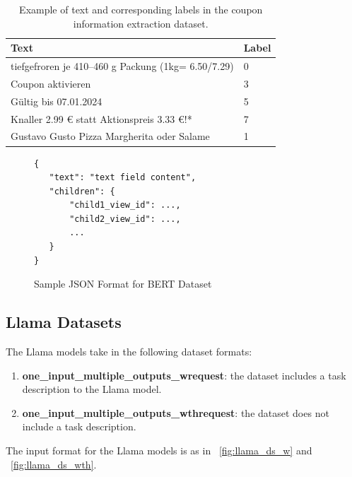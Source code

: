 \documentclass[licencjacka,en]{pracamgr}
\begin{document}
\begin{table}[h]
\centering
\begin{tabular}{|p{8cm}|p{2cm}|}
\hline
\textbf{Text} & \textbf{Label} \\
\hline
tiefgefroren je 410--460 g Packung (1kg= 6.50/7.29) & 0 \\
\hline
Coupon aktivieren & 3 \\
\hline
Gültig bis 07.01.2024 & 5 \\
\hline
Knaller 2.99 € statt Aktionspreis 3.33 €!* & 7 \\
\hline
Gustavo Gusto Pizza Margherita oder Salame & 1 \\
\hline
\end{tabular}
\caption{Example of text and corresponding labels in the coupon information extraction dataset.}
\label{tab:coupon_extraction_example}
\end{table}

\begin{figure}[ht]
\centering
\begin{tcolorbox}[sharp corners, boxrule=0.5mm, colframe=black, colback=white, coltitle=black, width=0.9\textwidth] 
\begin{BVerbatim}
{
   "text": "text field content",
   "children": {
       "child1_view_id": ...,
       "child2_view_id": ...,
       ...
   }
}
\end{BVerbatim}
\end{tcolorbox}
\caption{Sample JSON Format for BERT Dataset}
\label{fig:json_example_xml_tree}
\end{figure}

\subsection{Llama Datasets}\label{llamaDsDesc}
The Llama models take in the following dataset formats:

\begin{enumerate}
    \item \textbf{one\_input\_multiple\_outputs\_wrequest}: the dataset includes a task description to the Llama model.
    \item \textbf{one\_input\_multiple\_outputs\_wthrequest}: the dataset does not include a task description.
\end{enumerate}

The input format for the Llama models is as in ~\ref{fig:llama_ds_w} and ~\ref{fig:llama_ds_wth}.
\end{document}
